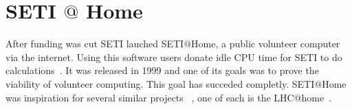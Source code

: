 \section{SETI $@$ Home}

After funding was cut SETI lauched SETI$@$Home, a public volunteer computer 
via the internet. Using this software users donate idle CPU time for SETI to do 
calculations~\cite{www-hid-sp18-601-sathome-about}. It was released in 1999 and 
one of its goals was to prove the viability of volunteer computing. This goal 
has succeded completly. SETI$@$Home was inspiration for several similar projects
 ~\cite{www-hid-sp18-601-boinc-projects}, one of each is the 
 LHC$@$home~\cite{www-hid-sp18-601-lhc-at-home-history}.